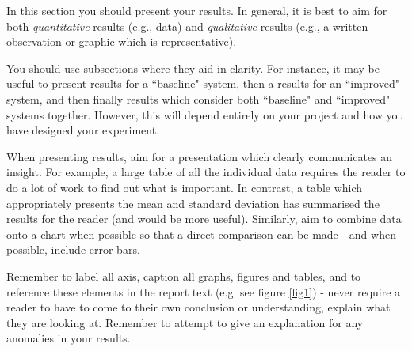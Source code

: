 \documentclass[conference]{IEEEtran}
\begin{document}

In this section you should present your results.  In general, it is best to aim for both \emph{quantitative} results (e.g., data) and \emph{qualitative} results (e.g., a written observation or graphic which is representative).  

You should use subsections where they aid in clarity.  For instance, it may be useful to present results for a ``baseline" system, then a results for an ``improved" system, and then finally results which consider both ``baseline" and ``improved" systems together.  However, this will depend entirely on your project and how you have designed your experiment.

When presenting results, aim for a presentation which clearly communicates an insight. For example, a large table of all the individual data requires the reader to do a lot of work to find out what is important.  In contrast, a table which appropriately presents the mean and standard deviation has summarised the results for the reader (and would be more useful).  Similarly, aim to combine data onto a chart when possible so that a direct comparison can be made - and when possible, include error bars.  


Remember to label all axis, caption all graphs, figures and tables, and to reference these elements in the report text (e.g. see figure \ref{fig1}) - never require a reader to have to come to their own conclusion or understanding, explain what they are looking at.  Remember to attempt to give an explanation for any anomalies in your results.  
\end{document}
